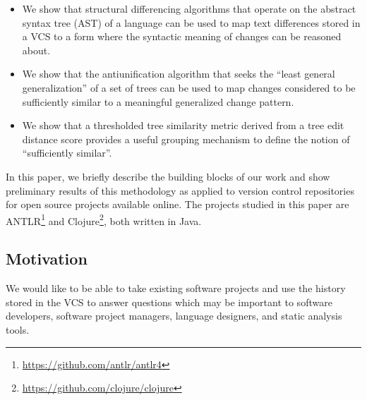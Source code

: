 \begin{itemize}

\item We show that structural differencing algorithms that operate on the
abstract syntax tree (AST) of a language can be used to map text
differences stored in a VCS to a form where the syntactic meaning of changes
can be reasoned about.

\item We show that the antiunification algorithm that seeks the ``least general
generalization'' of a set of trees can be used to map changes considered to be
sufficiently similar to a meaningful generalized change pattern.

\item We show that a thresholded tree similarity metric derived from
a tree edit distance score provides a useful grouping mechanism to define
the notion of ``sufficiently similar''.

\end{itemize}

In this paper, we briefly describe the building blocks of our work and show
preliminary results of this methodology as applied to version control
repositories for open source projects available online.  The projects studied
in this paper are ANTLR\footnote{\url{https://github.com/antlr/antlr4}} and
Clojure\footnote{\url{https://github.com/clojure/clojure}}, both written in
Java.

\subsection{Motivation}
\label{sec:motivation}

We would like to be able to take existing software projects and use the history
stored in the VCS to answer questions which may be important to software
developers, software project managers, language designers, and static analysis
tools.


